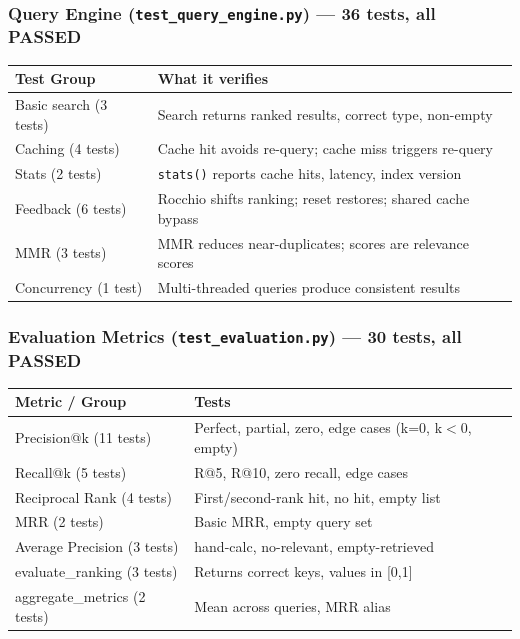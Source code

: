 \documentclass[12pt]{article}
\begin{document}
\subsubsection*{Query Engine (\texttt{test\_query\_engine.py}) --- 36 tests, all PASSED}
\begin{table}[H]
\centering
\footnotesize
\begin{tabular}{|p{7cm}|p{7.5cm}|}
\hline
\textbf{Test Group} & \textbf{What it verifies} \\
\hline
Basic search (3 tests)        & Search returns ranked results, correct type, non-empty \\
Caching (4 tests)             & Cache hit avoids re-query; cache miss triggers re-query \\
Stats (2 tests)               & \texttt{stats()} reports cache hits, latency, index version \\
Feedback (6 tests)            & Rocchio shifts ranking; reset restores; shared cache bypass \\
MMR (3 tests)                 & MMR reduces near-duplicates; scores are relevance scores \\
Concurrency (1 test)          & Multi-threaded queries produce consistent results \\
\hline
\end{tabular}
\end{table}

\subsubsection*{Evaluation Metrics (\texttt{test\_evaluation.py}) --- 30 tests, all PASSED}
\begin{table}[H]
\centering
\footnotesize
\begin{tabular}{|p{7cm}|p{7.5cm}|}
\hline
\textbf{Metric / Group} & \textbf{Tests} \\
\hline
Precision@k (11 tests)  & Perfect, partial, zero, edge cases (k=0, k$<$0, empty) \\
Recall@k (5 tests)      & R@5, R@10, zero recall, edge cases \\
Reciprocal Rank (4 tests) & First/second-rank hit, no hit, empty list \\
MRR (2 tests)           & Basic MRR, empty query set \\
Average Precision (3 tests) & hand-calc, no-relevant, empty-retrieved \\
evaluate\_ranking (3 tests) & Returns correct keys, values in [0,1] \\
aggregate\_metrics (2 tests) & Mean across queries, MRR alias \\
\hline
\end{tabular}
\end{table}
\end{document}
